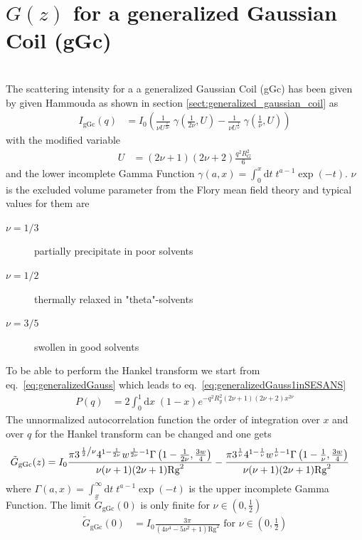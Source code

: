 \section{$G(z)$ for a generalized Gaussian Coil (gGc) }~\\
The scattering intensity for a a generalized Gaussian Coil (gGc) has been given by given Hammouda \cite{Hammouda,Hammouda2012,Hammouda1993,Hammouda2016} as shown in section \ref{sect:generalized_gaussian_coil} as
\begin{align}
I_\text{gGc}(q) &= I_0
\left(
\frac{1}{\nu U^{\frac{1}{2 \nu}}} \; \gamma\left(\frac{1}{2 \nu},U\right)-
\frac{1}{\nu U^{\frac{1}{  \nu}}} \; \gamma\left(\frac{1}{  \nu},U\right)
\right)
\label{eq:generalizedGauss1inSESANS}
\end{align}
with the modified variable
\begin{align}
U&= \left(2\nu+1\right)\left(2\nu+2\right)\frac{q^2R_G^2}{6}
\end{align}
and the lower incomplete Gamma Function $\gamma(a,x) = \int_0^x \mathrm{d}t \; t^{a-1} \exp(-t)$.
$\nu$ is the excluded volume parameter from the Flory mean field theory and typical values for them are
\begin{description}
\item[$\nu=1/3$] partially precipitate in poor solvents
\item[$\nu=1/2$] thermally relaxed in "theta"-solvents
\item[$\nu=3/5$] swollen in good solvents
\end{description}
To be able to perform the Hankel transform we start from eq.\ \ref{eq:generalizedGauss} which leads to eq.\ \ref{eq:generalizedGauss1inSESANS}
\begin{align}
P(q) &= 2\int_0^1 \mathrm{d}x \; (1-x)e^{-q^2R_g^2(2\nu+1)(2\nu+2)x^{2\nu}}
\label{eq:generalizedGaussinSESANS}
\end{align}
The unnormalized autocorrelation function the order of integration over $x$ and  over $q$ for the Hankel transform can be changed and one gets
\begin{align}
\tilde{G}_\mathrm{gGc}(z) &=
 I_0 
 \frac{\pi  3^{\left.\frac{1}{2}\right/\nu } 4^{1-\frac{1}{2 \nu }} w^{\frac{1}{2
   \nu }-1} \Gamma \left(1-\frac{1}{2 \nu },\frac{3 w}{4}\right)}{\nu  (\nu +1) (2
   \nu +1) \text{Rg}^2}-\frac{\pi  3^{\frac{1}{\nu }} 4^{1-\frac{1}{\nu }}
   w^{\frac{1}{\nu }-1} \Gamma \left(1-\frac{1}{\nu },\frac{3 w}{4}\right)}{\nu
   (\nu +1) (2 \nu +1) \text{Rg}^2}
\end{align}
where $\Gamma(a,x) = \int_x^\infty \mathrm{d}t \; t^{a-1} \exp(-t)$ is the upper incomplete Gamma Function.
The limit $\tilde{G}_\mathrm{gGc}(0)$ is only finite for $\nu \in \left(0,\frac12\right)$
\begin{align}
\tilde{G}_\mathrm{gGc}(0) &= I_0 \frac{3 \pi }{\left(4 \nu ^4-5 \nu ^2+1\right) \text{Rg}^2} \mbox{~for~} \nu \in \left(0,\frac12\right)
\end{align}